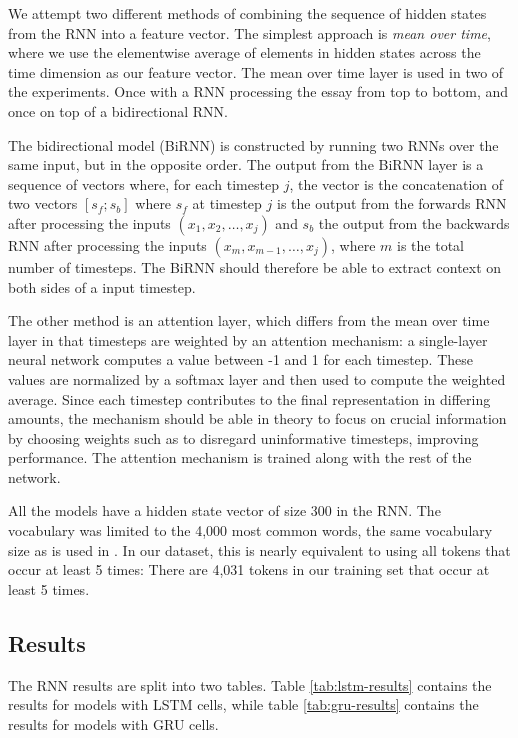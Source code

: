 We attempt two different methods of combining the sequence of hidden states
from the \ac{RNN} into a feature vector. The simplest approach is \emph{mean
over time}, where we use the elementwise average of elements in hidden states
across the time dimension as our feature vector. The mean over time layer is
used in two of the experiments. Once with a \ac{RNN} processing the essay
from top to bottom, and once on top of a bidirectional RNN.

The bidirectional model (BiRNN) is constructed by running two \acp{RNN} over
the same input, but in the opposite order. The output from the BiRNN layer is
a sequence of vectors where, for each timestep $j$, the vector is the
concatenation of two vectors $[s_f;s_b]$ where $s_f$ at timestep $j$ is the
output from the forwards \ac{RNN} after processing the inputs $(x_1, x_2,
\ldots, x_j)$ and $s_b$ the output from the backwards \ac{RNN} after
processing the inputs $(x_m, x_{m-1}, \ldots, x_j)$, where $m$ is the total
number of timesteps. The BiRNN should therefore be able to extract context on
both sides of a input timestep.


The other method is an attention layer, which differs from the mean over
time layer in that timesteps are weighted by an attention mechanism: a
single-layer neural network computes a value between -1 and 1 for each
timestep. These values are normalized by a softmax layer and then used to
compute the weighted average. Since each timestep contributes to the final
representation in differing amounts, the mechanism should be able in theory
to focus on crucial information by choosing weights such as to disregard
uninformative timesteps, improving performance. The attention mechanism is
trained along with the rest of the network.

All the models have a hidden state vector of size 300 in the \ac{RNN}. The
vocabulary was limited to the 4,000 most common words, the same vocabulary
size as is used in \textcite{taghipour16}. In our dataset, this is nearly
equivalent to using all tokens that occur at least 5 times: There are 4,031
tokens in our training set that occur at least 5 times.


\subsection{Results}

The RNN results are split into two tables. Table \ref{tab:lstm-results} contains
the results for models with \ac{LSTM} cells, while table \ref{tab:gru-results}
contains the results for models with \ac{GRU} cells.

